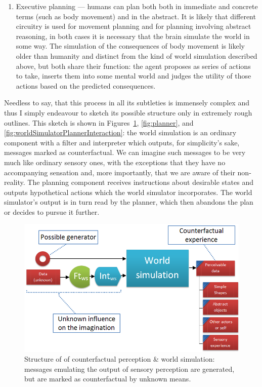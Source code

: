 \begin{enumerate}
	
	\item Executive planning --- humans can plan both both in immediate and concrete terms (such as body movement) and in the abstract. It is likely that different circuitry is used for movement planning and for planning involving abstract reasoning, in both cases it is necessary that the brain simulate the world in some way. The simulation of the consequences of body movement is likely older than humanity and distinct from the kind of world simulation described above, but both share their function: the agent proposes as series of actions to take, inserts them into some mental world and judges the utility of those actions based on the predicted consequences.
\end{enumerate}

Needless to say, that this process in all its subtleties is immensely complex and thus I simply endeavour to sketch its possible structure only in extremely rough outlines. This sketch is shown in Figures~\ref{fig:imagination},  \ref{fig:planner}, and \ref{fig:worldSimulatorPlannerInteraction}: the world simulation is an ordinary component with a filter and interpreter which outputs, for simplicity's sake, messages marked as counterfactual. We can imagine such messages to be very much like ordinary sensory ones, with the exceptions that they have no accompanying sensation and, more importantly, that we are aware of their non-reality. The planning component receives instructions about desirable states and outputs hypothetical actions which the world simulator incorporates. The world simulator's output is in turn read by the planner, which then abandons the plan or decides to pursue it further.

\begin{figure}
	\centering
	\includegraphics[width=\textwidth]{figs/imagination.png}
	\caption{Structure of of counterfactual perception \& world simulation: messages emulating the output of sensory perception are generated, but are marked as counterfactual by unknown means.}
	\label{fig:imagination}
\end{figure}

